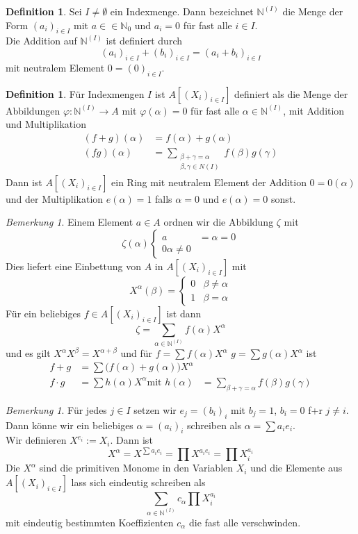 \documentclass[10pt,a4paper]{article}
\newcommand{\N}{\ensuremath{\mathbb{N}}}
\newcommand{\al}{\ensuremath{\alpha}}
\theoremstyle{plain}
\theoremstyle{definition}
\newtheorem{definition}[theorem]{Definition}
\theoremstyle{remark}
\newtheorem{bem}[theorem]{Bemerkung}
\newtheorem*{bem*}{Bemerkung}
\begin{document}
	\begin{definition}
		Sei $I\neq\emptyset$ ein Indexmenge. Dann bezeichnet $\N^(I)$ die Menge der Form $(a_i)_{i\in I}$ mit $a\in\in\N_0$ und $a_i=0$ für fast alle $i\in I$.\\
		Die Addition auf $\N^{(I)}$ ist definiert durch
		\[(a_i)_{i\in I}+(b_i)_{i\in I}=(a_i+b_i)_{i\in I}\]
		mit neutralem Element $0=(0)_{i\in I}$.
	\end{definition}

	\begin{definition}
		Für Indexmengen $I$ ist $A[(X_i)_{i\in I}]$ definiert als die Menge der Abbildungen $\varphi:\N^{(I)}\to A$ mit $\varphi(\al)=0$ für fast alle $\al\in \N^{(I)}$, mit Addition und Multiplikation
		\begin{align*}
		(f+g)(\al)&=f(\al)+g(\al)\\
		(fg)(\al)&=\sum_{\substack{\beta+\gamma=\al\\\beta,\gamma\in N(I)}}f(\beta)g(\gamma)
		\end{align*}
		Dann ist $A[(X_i)_{i\in I}]$ ein Ring mit neutralem Element der Addition $0=0(\al)$ und der Multiplikation $e(\al)=1$ falls $\al=0$ und $e(\al)=0$ sonst.
	\end{definition}

	\begin{bem*}
		Einem Element $a\in A$ ordnen wir die Abbildung $\zeta$ mit \[\zeta(\al)\begin{cases}
		a&=\al=0\\
		0\al\neq 0
		\end{cases}\]
		Dies liefert eine Einbettung von $A$ in $A[(X_i)_{i\in I}]$ mit
		\[X^\al(\beta)=\begin{cases}
		0&\beta\neq \al\\
		1&\beta=\al
		\end{cases}\]
		Für ein beliebiges $f\in A[(X_i)_{i\in I}]$ ist dann
		\[\zeta=\sum_{\al\in\N^{(I)}}f(\al)X^\al\]
		und es gilt $X^\al X^\beta=X^{\al+\beta}$ und für $f=\sum f(\al)X^\al$ $g=\sum g(\al)X^\al$ ist
		\begin{align}
		f+g&=\sum\big(f(\al)+g(\al)\big)X^\al\\
		f\cdot g&=\sum h(\al)X^\al
		\text{mit }h(\al)&=\sum_{\beta+\gamma=\al}f(\beta)g(\gamma)
		\end{align}
	\end{bem*}

	\begin{bem}
		Für jedes $j\in I$ setzen wir $e_j=(b_i)_i$ mit $b_j=1$, $b_i=0$ f+r $j\neq i$.\\
		Dann könne wir ein beliebiges $\al=(a_i)_i$ schreiben als $\al=\sum a_ie_i$.\\
		Wir definieren $X^{e_i}:=X_i$. Dann ist
		\[X^\al=X^{\sum a_ie_i}=\prod X^{a_ie_i}=\prod X_i^{a_i}\]
		Die $X^\al$ sind die primitiven Monome in den Variablen $X_i$ und die Elemente aus $A[(X_i)_{i\in I}]$ lass sich eindeutig schreiben als
		\[\sum_{\al\in \N^{(I)}}c_\al\prod X_i^{a_i}\]
		mit eindeutig bestimmten Koeffizienten $c_\al$ die fast alle verschwinden.
	\end{bem}
\end{document}
